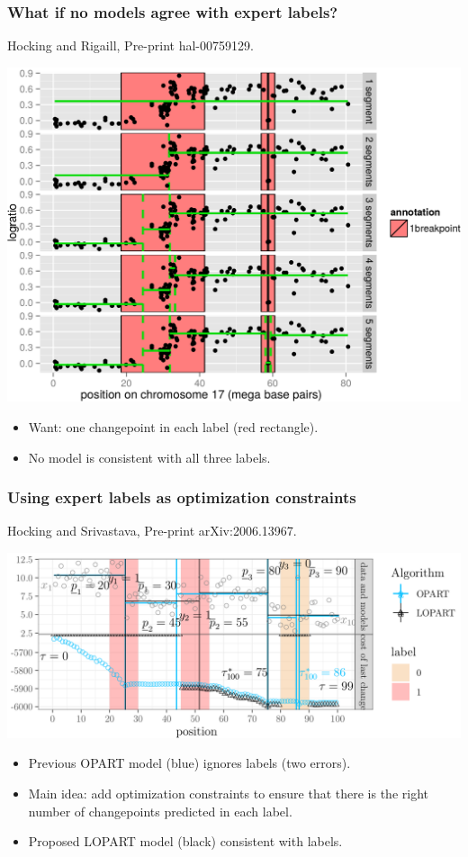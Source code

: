 \documentclass{beamer}
\begin{document}
\begin{frame}
  \frametitle{What if no models agree with expert labels?}
  Hocking and Rigaill, Pre-print hal-00759129.

  \includegraphics[width=0.8\linewidth]{SegAnnot-motivation}

  \begin{itemize}
  \item Want: one changepoint in each label (red rectangle).
  \item No model is consistent with all three labels.
  \end{itemize}
\end{frame}

\begin{frame}
  \frametitle{Using expert labels as optimization constraints}
  Hocking and Srivastava, Pre-print arXiv:2006.13967.

  \includegraphics[width=\linewidth]{LOPART-notation}

  \begin{itemize}
  \item Previous OPART model (blue) ignores labels (two errors).
  \item Main idea: add optimization constraints to ensure that there
    is the right number of changepoints predicted in each label.
  \item Proposed LOPART model (black) consistent with labels.
  \end{itemize}
\end{frame}
\end{document}
